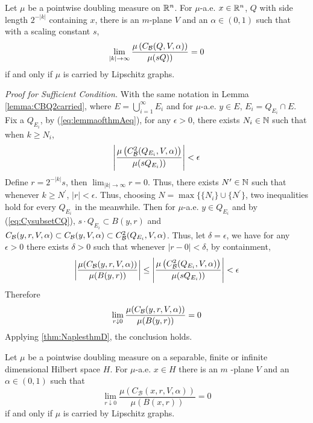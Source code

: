 \begin{lemma}\label{lemma:ofthmA} 
    Let $\mu$ be a pointwise doubling measure on $\mathbb{R}^n$. For $\mu$-a.e. $x \in \mathbb{R}^n$, $Q$ with side length $2^{-|k|}$ containing $x$, there is an $m$-plane $V$ and an $\alpha \in(0,1)$ such that with a scaling constant $s$,
    \begin{equation}\label{eq:lemmaofthmAeq}
        \lim_{|k| \rightarrow \infty} \frac{\mu\left(C_\mathcal B(Q, V, \alpha)\right)}{\mu(sQ))}=0
    \end{equation}
    if and only if $\mu$ is carried by Lipschitz graphs.
\end{lemma}
\textit{Proof for Sufficient Condition.} With the same notation in Lemma \ref{lemma:CBQ2carried}, where $E = \bigcup_{i=1}^\infty E_i$ and for $\mu$-a.e. $y\in E$, $E_i = Q_{E_i}\cap E$. Fix a $Q_{E_i}$, by (\ref{eq:lemmaofthmAeq}), for any $\epsilon>0$, there exists $N_i\in\mathbb{N}$ such that when $k\geq N_i$, 
$$\left |\frac{\mu\left(C_\mathcal B^2(Q_{E_i}, V, \alpha)\right)}{\mu(sQ_{E_i}))}\right | < \epsilon$$
Define $r = 2^{-|k|}s$, then $\lim_{|k|\rightarrow\infty} r = 0$. Thus, there exists $N^\prime\in \mathbb{N}$ such that whenever $k\geq N^\prime$, $|r|<\epsilon$. Thus, choosing $N=\max\{\{N_i\}\cup\{N^\prime\}$, two inequalities hold for every $Q_{E_i}$ in the meanwhile. Then for $\mu$-a.e. $y\in Q_{E_i}$ and by (\ref{eq:CysubsetCQ}), $s\cdot Q_{E_i}\subset B(y, r)$ and $C_\mathcal B(y, r, V, \alpha)\subset C_\mathcal B(y, V, \alpha)\subset C_\mathcal B^2(Q_{E_i}, V, \alpha)$. Thus, let $\delta = \epsilon$, we have for any $\epsilon>0$ there exists $\delta>0$ such that whenever $|r-0|<\delta$, by containment, 
\begin{equation}
    \left|  \frac{\mu(C_\mathcal B(y, r, V, \alpha))}{\mu(B(y, r))} \right| \leq \left |\frac{\mu\left(C_\mathcal B^2(Q_{E_i}, V, \alpha)\right)}{\mu(sQ_{E_i}))}\right| < \epsilon
\end{equation}
Therefore
\begin{equation}\label{eq:lemmathmAeq2}
    \lim_{r\downarrow 0} \frac{\mu(C_\mathcal B(y, r, V, \alpha))}{\mu(B(y, r))} = 0
\end{equation}
Applying \ref{thm:NaplesthmD}, the conclusion holds.


\begin{customthm}{{\cite[Theorem D]{naples2020}}}\label{thm:NaplesthmD}
    Let $\mu$ be a pointwise doubling measure on a separable, finite or infinite dimensional Hilbert space $H$. For $\mu$-a.e. $x \in H$ there is an $m$ -plane $V$ and an $\alpha \in(0,1)$ such that
$$
\lim _{r \downarrow 0} \frac{\mu\left(C_{\mathcal{B}}(x, r, V, \alpha)\right)}{\mu(B(x, r))}=0
$$
if and only if $\mu$ is carried by Lipschitz graphs.
\end{customthm}





